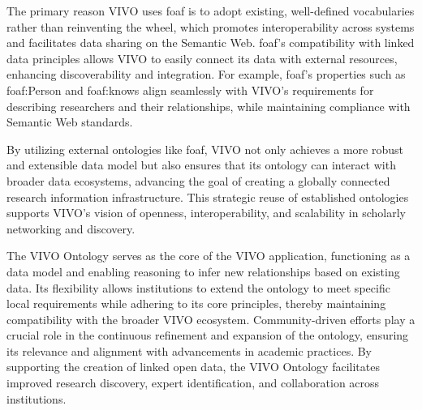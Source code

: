 The primary reason VIVO uses \gls{foaf} is to adopt existing, well-defined vocabularies rather than reinventing the wheel, which promotes interoperability across systems and facilitates data sharing on the Semantic Web.
\gls{foaf}'s compatibility with linked data principles allows VIVO to easily connect its data with external resources, enhancing discoverability and integration.
For example, \gls{foaf}'s properties such as foaf:Person and foaf:knows align seamlessly with VIVO's requirements for describing researchers and their relationships, while maintaining compliance with Semantic Web standards.

By utilizing external ontologies like \gls{foaf}, VIVO not only achieves a more robust and extensible data model but also ensures that its ontology can interact with broader data ecosystems, advancing the goal of creating a globally connected research information infrastructure.
This strategic reuse of established ontologies supports VIVO's vision of openness, interoperability, and scalability in scholarly networking and discovery.

The VIVO Ontology serves as the core of the VIVO application, functioning as a data model and enabling reasoning to infer new relationships based on existing data.
Its flexibility allows institutions to extend the ontology to meet specific local requirements while adhering to its core principles, thereby maintaining compatibility with the broader VIVO ecosystem.
Community-driven efforts play a crucial role in the continuous refinement and expansion of the ontology, ensuring its relevance and alignment with advancements in academic practices.
By supporting the creation of linked open data, the VIVO Ontology facilitates improved research discovery, expert identification, and collaboration across institutions.


 
